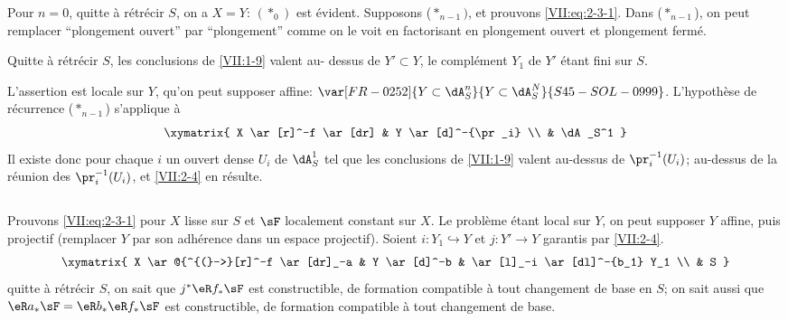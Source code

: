 Pour $n=0$, quitte à rétrécir $S$, on a $X=Y$: $(\ast_0)$ est évident. 
Supposons ($\ast_{n-1})$, et prouvons \eqref{VII:eq:2-3-1}. Dans 
($\ast_{n-1}$), on peut remplacer ``plongement ouvert'' par ``plongement'' 
comme on le voit en factorisant en plongement ouvert et plongement fermé. 





\begin{lemma_}\label{VII:2-4}
Quitte à rétrécir $S$, les conclusions de \ref{VII:1-9} valent au-
dessus de $Y'\subset Y$, le complément $Y_1$ de $Y'$ étant fini sur $S$. 
\end{lemma_}

L'assertion est locale sur $Y$, qu'on peut supposer affine: $\var[FR-0252]{Y\subset \dA_S^n}{Y\subset \dA_S^N}{S45-SOL-0999}$. 
L'hypothèse de récurrence ($\ast_{n-1}$) s'applique à 
\[\xymatrix{
  X \ar[r]^-f \ar[dr] 
    & Y \ar[d]^-{\pr_i} \\
  & \dA_S^1 
}\]
Il existe donc pour chaque $i$ un ouvert dense $U_i$ de $\dA_S^1$ tel que les 
conclusions de \ref{VII:1-9} valent au-dessus de $\pr_i^{-1}(U_i)$;  
au-dessus de la réunion des $\pr_i^{-1}(U_i)$, et \ref{VII:2-4} en résulte. 





\addtocounter{subsection}{1} %
\subsection{}\label{VII:2-6}

Prouvons \eqref{VII:eq:2-3-1} pour $X$ lisse sur $S$ et $\sF$ localement 
constant sur $X$. Le problème étant local sur $Y$, on peut supposer $Y$ 
affine, puis projectif (remplacer $Y$ par son adhérence dans un espace 
projectif). Soient $i:Y_1\hookrightarrow Y$ et $j:Y' \to Y$ garantis par 
\ref{VII:2-4}. 
\[\xymatrix{
  X \ar@{^{(}->}[r]^-f \ar[dr]_-a 
    & Y \ar[d]^-b 
    & \ar[l]_-i \ar[dl]^-{b_1} Y_1 \\
  & S 
}\] 
quitte à rétrécir $S$, on sait que $j^\ast \eR f_\ast \sF$ est 
constructible, de formation compatible à tout changement de base en $S$; on 
sait aussi que $\eR a_\ast \sF = \eR b_\ast \eR f_\ast \sF$ est constructible, 
de formation compatible à tout changement de base. 

